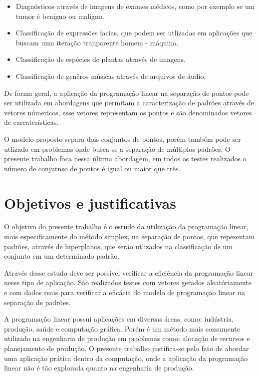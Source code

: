 \begin{itemize}
\item Diagnósticos através de imagens de exames médicos, como por exemplo se um tumor é benigno ou maligno.
\item Classificação de expressões facias, que podem ser utlizadas em aplicações que buscam uma iteração tranparente homem - máquina.
\item Classificação de espécies de plantas através de imagens.
\item Classificação de genêros músicas através de arquivos de áudio.
\end{itemize}

De forma geral, a aplicação da programação linear na separação de pontos pode ser utilizada em abordagens que permitam a caracterização de padrões através de vetores númericos, esse vetores representam os pontos e são denominados vetores de carcaterísticas.

O modelo proposto separa dois conjuntos de pontos, porém também pode ser utlizado em problemas onde busca-se a separação de múltiplos padrões. O presente trabalho foca nessa última abordagem, em todos os testes realizados o número de conjutnso de pontos é igual ou maior que três.

\section{Objetivos e justificativas}
O objetivo do presente trabalho é o estudo da utilização da programação linear, mais especificamente do método simplex, na separação de pontos, que repesentam padrões, através de hiperplanos, que serão utlizados na classificação de um conjunto em um determinado padrão. 

Através desse estudo deve ser possível verificar a eficiência da programação linear nesse tipo de aplicação. São realizados testes com vetores gerados aleatóriamente e com dados reais para verificar a eficácia do modelo de programação linear na separação de padrões.

A programação linear possui aplicações em diversas áreas, como: indústria, produção, saúde e computação gráfica. Porém é um método mais comumente utilizado na engenharia de produção em problemas como: alocação de recursos e planejamento de produção. O presente trabalho justifica-se pelo fato de abordar uma aplicação prática dentro da computação, onde a aplicação da programação linear não é tão explorada quanto na engenharia de produção.

